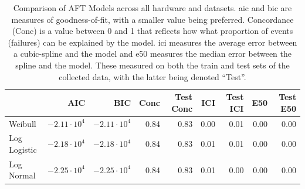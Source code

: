 \documentclass[sn-mathphys-num]{sn-jnl}%
\begin{document}
\begin{table}
\centering
\caption{Comparison of AFT Models across all hardware and datasets. \acrshort{aic} and \acrshort{bic} are measures of goodness-of-fit, with a smaller value being preferred. Concordance (Conc) is a value between 0 and 1 that reflects how what proportion of events (failures) can be explained by the model. \acrshort{ici} measures the average error between a cubic-spline and the model and \acrshort{e50} measures the median error between the spline and the model. These measured on both the train and test sets of the collected data, with the latter being denoted ``Test''.}
\label{tab:combined}
\begin{tabular}{lrrrrrrrr}
\toprule
             & AIC              & BIC & Conc & Test Conc & ICI & Test ICI & E50 & Test E50 \\
\midrule
Weibull      & $-2.11\cdot10^4$ & $-2.11\cdot10^4$ & 0.84 & 0.83 & 0.00 & 0.01 & 0.00 & 0.00 \\
Log Logistic & $-2.18\cdot10^4$ & $-2.18\cdot10^4$ & 0.84 & 0.83 & 0.01 & 0.01 & 0.00 & 0.00 \\
Log Normal   & $-2.25\cdot10^4$ & $-2.25\cdot10^4$ & 0.84 & 0.83 & 0.01 & 0.00 & 0.00 & 0.00 \\
\bottomrule
\end{tabular}
\end{table}
\end{document}
